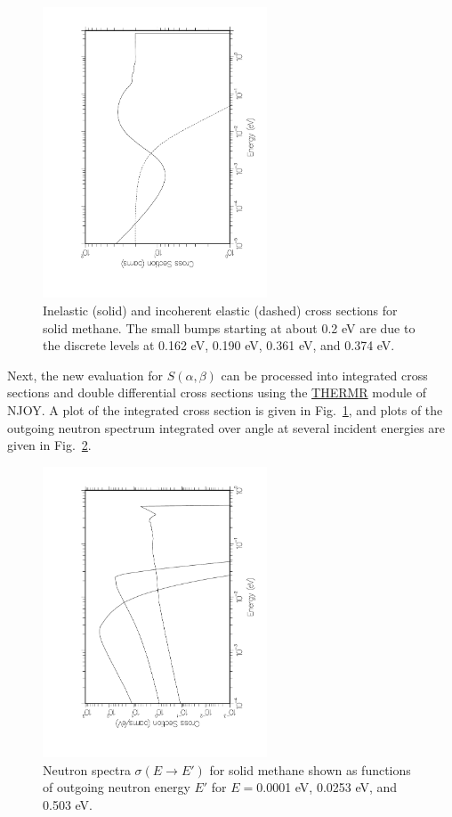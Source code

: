 \begin{figure}[b]\centering
\includegraphics[keepaspectratio, height=3.4in, angle=270]{figs/le3ack}
\caption[Inelastic and incoherent elastic cross sections for solid methane]
{Inelastic (solid) and incoherent elastic (dashed) cross sections for
 solid methane.  The small bumps starting at about 0.2 eV are due to
 the discrete levels at 0.162 eV, 0.190 eV, 0.361 eV, and 0.374 eV.}
\label{smeth}
\end{figure}

Next, the new evaluation for $S(\alpha,\beta)$ can be processed into
integrated cross sections and double differential cross sections using
the \hyperlink{sTHERMRhy}{THERMR} module of NJOY.  A plot
of the integrated cross section
is given in Fig.~\ref{smeth}, and plots of the outgoing neutron
spectrum integrated over angle at several incident energies are
given in Fig.~\ref{fig4}.

\begin{figure}[t]\centering
\includegraphics[keepaspectratio, height=3.4in, angle=270]{figs/le4ack}
\caption[Outgoing neutron spectra for solid methane]{Neutron spectra
 $\sigma(E{\rightarrow}E')$ for solid methane shown as functions of
 outgoing neutron energy $E'$ for $E=$0.0001 eV, 0.0253 eV, and 0.503 eV.}
\label{fig4}
\end{figure}

